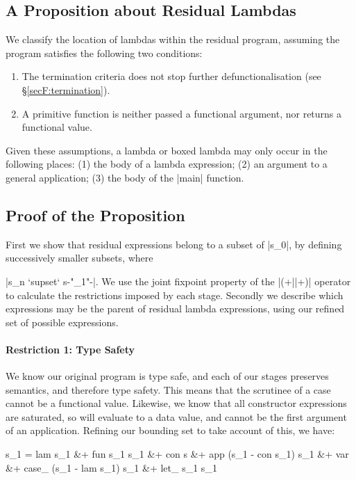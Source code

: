 \subsection{A Proposition about Residual Lambdas}

We classify the location of lambdas within the residual program, assuming the program satisfies the following two conditions:

\begin{enumerate}
\item The termination criteria does not stop further defunctionalisation (see \S\ref{secF:termination}).
\item A primitive function is neither passed a functional argument, nor returns a functional value.
\end{enumerate}

Given these assumptions, a lambda or boxed lambda may only occur in the following places: (1) the body of a lambda expression; (2) an argument to a general application; (3) the body of the |main| function.

\subsection{Proof of the Proposition}

First we show that residual expressions belong to a subset of |s_0|, by defining successively smaller subsets, where \ignore|s_n `supset` s{-"_{\text{\tiny{+}}1}"-}|. We use the joint fixpoint property of the |(+||+)| operator to calculate the restrictions imposed by each stage. Secondly we describe which expressions may be the parent of residual lambda expressions, using our refined set of possible expressions.

\paragraph{Restriction 1: Type Safety}
We know our original program is type safe, and each of our stages preserves semantics, and therefore type safety. This means that the scrutinee of a case cannot be a functional value. Likewise, we know that all constructor expressions are saturated, so will evaluate to a data value, and cannot be the first argument of an application. Refining our bounding set to take account of this, we have:

\ignore\begin{code}
s_1  =  lam s_1 &+ fun s_1 s_1 &+ con s &+ app (s_1 - con s_1) s_1 &+ var &+
        case_ (s_1 - lam s_1) s_1 &+ let_ s_1 s_1
\end{code}

